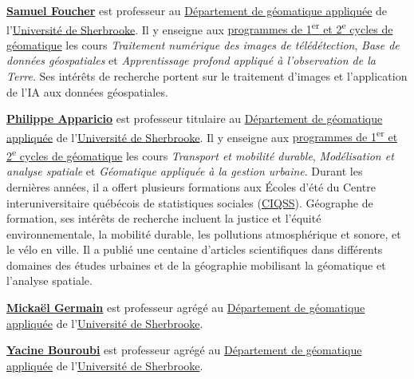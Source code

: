 \documentclass[
  11pt,
  letterpaper,
  open=any,
  twoside=false,
  french]{scrbook}
\begin{document}

\href{https://www.usherbrooke.ca/recherche/fr/specialistes/details/samuel.foucher}{\textbf{Samuel
Foucher}} est professeur au
\href{https://www.usherbrooke.ca/geomatique/}{Département de géomatique
appliquée} de l'\href{https://www.usherbrooke.ca/}{Université de
Sherbrooke}. Il y enseigne aux
\href{https://www.usherbrooke.ca/geomatique/etudes/programmes}{programmes
de 1\textsuperscript{er} et 2\textsuperscript{e} cycles de géomatique}
les cours \emph{Traitement numérique des images de télédétection},
\emph{Base de données géospatiales} et \emph{Apprentissage profond
appliqué à l'observation de la Terre}. Ses intérêts de recherche portent
sur le traitement d'images et l'application de l'IA aux données
géospatiales.

\href{https://www.usherbrooke.ca/recherche/fr/specialistes/details/philippe.apparicio}{\textbf{Philippe
Apparicio}} est professeur titulaire au
\href{https://www.usherbrooke.ca/geomatique/}{Département de géomatique
appliquée} de l'\href{https://www.usherbrooke.ca/}{Université de
Sherbrooke}. Il y enseigne aux
\href{https://www.usherbrooke.ca/geomatique/etudes/programmes}{programmes
de 1\textsuperscript{er} et 2\textsuperscript{e} cycles de géomatique}
les cours \emph{Transport et mobilité durable}, \emph{Modélisation et
analyse spatiale} et \emph{Géomatique appliquée à la gestion urbaine}.
Durant les dernières années, il a offert plusieurs formations aux Écoles
d'été du Centre interuniversitaire québécois de statistiques sociales
(\href{https://www.ciqss.org/}{CIQSS}). Géographe de formation, ses
intérêts de recherche incluent la justice et l'équité environnementale,
la mobilité durable, les pollutions atmosphérique et sonore, et le vélo
en ville. Il a publié une centaine d'articles scientifiques dans
différents domaines des études urbaines et de la géographie mobilisant
la géomatique et l'analyse spatiale.

\href{https://www.usherbrooke.ca/geomatique/departement/personnel/personnel-enseignant/mickael-germain}{\textbf{Mickaël
Germain}} est professeur agrégé au
\href{https://www.usherbrooke.ca/geomatique/}{Département de géomatique
appliquée} de l'\href{https://www.usherbrooke.ca/}{Université de
Sherbrooke}.

\href{https://www.usherbrooke.ca/geomatique/departement/personnel/personnel-enseignant/yacine-bouroubi}{\textbf{Yacine
Bouroubi}} est professeur agrégé au
\href{https://www.usherbrooke.ca/geomatique/}{Département de géomatique
appliquée} de l'\href{https://www.usherbrooke.ca/}{Université de
Sherbrooke}.
\end{document}

